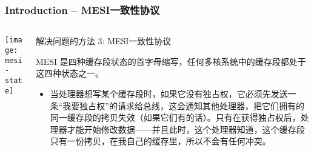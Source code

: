 \begin{frame}[plain]	
	\frametitle{Introduction -- MESI一致性协议}
	
	
	\begin{columns}
		
		\begin{column}{.4\textwidth}
			\texttt{[image: mesi-state]}
		\end{column}
		\begin{column}{.6\textwidth}
			解决问题的方法 3: MESI一致性协议
			
			MESI 是四种缓存段状态的首字母缩写，任何多核系统中的缓存段都处于这四种状态之一。
			\begin{itemize}
				
				\item 当处理器想写某个缓存段时，如果它没有独占权，它必须先发送一条“我要独占权”的请求给总线，这会通知其他处理器，把它们拥有的同一缓存段的拷贝失效（如果它们有的话）。只有在获得独占权后，处理器才能开始修改数据——并且此时，这个处理器知道，这个缓存段只有一份拷贝，在我自己的缓存里，所以不会有任何冲突。
			\end{itemize}
			
		\end{column}
	\end{columns}
	
\end{frame}

